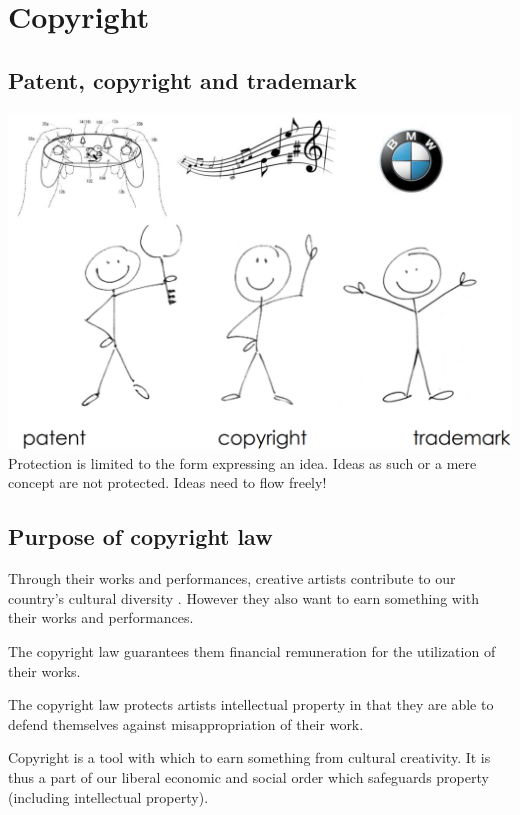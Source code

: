 \section{Copyright}
\subsection{Patent, copyright and trademark}
\includegraphics[width=1\linewidth]{images/patent_copyright_and_trademark}
Protection is limited to the form expressing an idea. Ideas as such or a mere concept are not protected. Ideas need to flow freely!

\subsection{Purpose of copyright law}
Through their works and performances, creative artists contribute to our country's cultural diversity . However they also want to earn something with their works and performances.
\begin{compactitem}
	\item The copyright law guarantees them financial remuneration for the utilization of their works. 
	\item The copyright law protects artists intellectual property in that they are able to defend themselves against misappropriation of their work.
	\item Copyright is a tool with which to earn something from cultural creativity. It is thus a part of our liberal economic and social order which safeguards property (including intellectual property). 
\end{compactitem}

